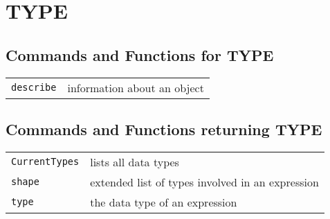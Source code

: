 \documentclass[a4paper]{mybook}
\begin{document}
\noindent



\chapter{TYPE}
\label{TYPE}

      

\section{Commands and Functions for TYPE}
\label{Commands and Functions for TYPE}

        

\begin{center}
\begin{longtable}{ll}
   
{\verb~describe~} &
      information about an object\\
   
\end{longtable}
\end{center}

\noindent



\section{Commands and Functions returning TYPE}
\label{Commands and Functions returning TYPE}

        

\begin{center}
\begin{longtable}{ll}
   
{\verb~CurrentTypes~} &
      lists all data types\\
   
{\verb~shape~} &
      extended list of types involved in an expression\\
   
{\verb~type~} &
      the data type of an expression\\
   
\end{longtable}
\end{center}

\noindent



\end{document}
